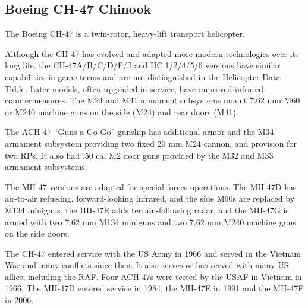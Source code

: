 
\subsection{Boeing CH-47 Chinook}

The Boeing CH-47 is a twin-rotor, heavy-lift transport helicopter.

Although the CH-47 has evolved and adapted more modern technologies over its long life, the CH-47A/B/C/D/F/J and HC.1/2/4/5/6 versions have similar capabilities in game terms and are not distinguished in the Helicopter Data Table. Later models, often upgraded in service, have improved infrared countermeasures. The M24 and M41 armament subsystems mount 7.62 mm M60 or M240 machine guns on the side (M24) and rear doors (M41).

The ACH-47 “Guns-a-Go-Go” gunship has additional armor and the M34 armament subsystem providing two fixed 20 mm M24 cannon, and provision for two  RPs. It also had .50 cal M2 door guns provided by the M32 and M33 armament subsystems.

The MH-47 versions are adapted for special-forces operations. The MH-47D has air-to-air refueling, forward-looking infrared, and the side M60s are replaced by M134 miniguns, the HH-47E adds terrain-following radar, and the MH-47G is armed with two 7.62 mm M134 miniguns and two 7.62 mm M240 machine guns on the side doors.

The CH-47 entered service with the US Army in 1966 and served in the Vietnam War and many conflicts since then. It also serves or has served with many US allies, including the RAF. Four ACH-47s were tested by the USAF in Vietnam in 1966. The MH-47D entered service in 1984, the MH-47E in 1991 and the MH-47F in 2006.
